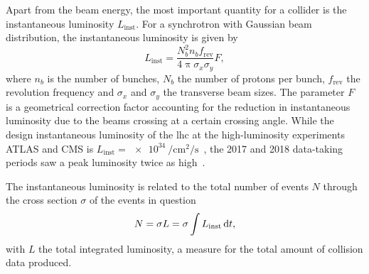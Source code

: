 Apart from the beam energy, the most important quantity for a collider is the instantaneous luminosity $L_\mathrm{inst}$. For a synchrotron with Gaussian beam distribution, the instantaneous luminosity is given by
\begin{equation}
	L_\mathrm{inst} = \frac{N_b^2 n_b f_\mathrm{rev}}{4\uppi\sigma_x\sigma_y} F,
	\label{eq:lumi}
\end{equation}
where $n_b$ is the number of bunches, $N_b$ the number of protons per bunch, $f_\mathrm{rev}$ the revolution frequency and $\sigma_x$ and $\sigma_y$ the transverse beam sizes.
The parameter $F$ is a geometrical correction factor accounting for the reduction in instantaneous luminosity due to the beams crossing at a certain crossing angle.
While the design instantaneous luminosity of the \gls{lhc} at the high-luminosity experiments ATLAS and CMS is $L_\mathrm{inst} = \SI{e34}{\per\cm\squared\per\second}$~\cite{Bruning:782076}, the 2017 and 2018 data-taking periods saw a peak luminosity twice as high~\cite{peak_lumi}.

The instantaneous luminosity is related to the total number of events $N$ through the cross section $\sigma$ of the events in question
\begin{equation}
	N = \sigma L = \sigma \int L_\mathrm{inst}\mathop{}\!\mathrm{d} t,
\end{equation}
with $L$ the total integrated luminosity, a measure for the total amount of collision data produced.

